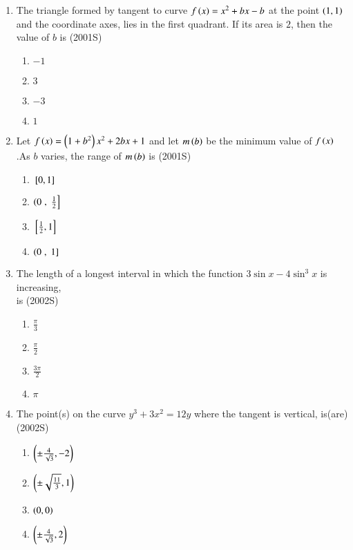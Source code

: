 \documentclass[journal,12pt,twocolumn]{IEEEtran}
\theoremstyle{remark}
\begin{document}
\begin{enumerate}[start=9]
\item The triangle formed by tangent to curve $f\left(x\right)=x^2+bx-b$ at the point $\left(1,1\right)$ and the coordinate axes, lies in the first quadrant. If its area is $2$, then the value of $b$ is 
\hfill (2001S)
\begin{enumerate}
    \item $-1$
    \item $3$ 
    \item $-3$
    \item $1$\\
\end{enumerate}
\item Let $f\left(x\right)=\left(1+b^2\right)x^2+2bx+1$ and let $m\left(b\right)$ be the minimum value of $f\left(x\right)$.As $b$ varies, the range of $m\left(b\right)$ is 
\hfill (2001S)
\begin{enumerate}
	\item ${}\left[0,1\right]$\\
	\item $\left(0\right.,{}\left.\frac{1}{2}\right]$\\
	\item ${}\left[\frac{1}{2},1\right]$\\
	\item $\left(0\right.,{}\left.1\right]$\\
\end{enumerate}
\item The length of a longest interval in which the function $3 \sin{x}-4\sin^3{x}$ is increasing,\\
is \hfill (2002S)
\begin{enumerate}
    \item $\frac{\pi}{3}$\\
    \item $\frac{\pi}{2}$\\
    \item $\frac{3\pi}{2}$\\
    \item $\pi$
\end{enumerate}
\item The point(s) on the curve $y^3+3x^2=12y$ where the tangent is vertical, is(are)
\hfill (2002S)\\
\begin{enumerate}
	\item $\left(\pm \frac{4}{\sqrt{3}},-2\right)$\\
	\item $\left(\pm\sqrt{\frac{11}{3}},1\right)$\\
	\item $\left(0,0\right)$\\
	\item $\left(\pm \frac{4}{\sqrt{3}},2\right)$\\\\
\end{enumerate}


\end{enumerate}
\end{document}
